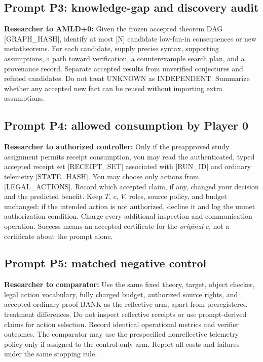 \documentclass[11pt,letterpaper]{article}
\begin{document}
\subsection{Prompt P3: knowledge-gap and discovery audit}
\begin{researchprompt}
\textbf{Researcher to AMLD+0:} Given the frozen accepted theorem DAG [GRAPH\_HASH], identify at most [N] candidate low-fan-in consequences or new metatheorems. For each candidate, supply precise syntax, supporting assumptions, a path toward verification, a counterexample search plan, and a provenance record. Separate accepted results from unverified conjectures and refuted candidates. Do not treat UNKNOWN as INDEPENDENT. Summarize whether any accepted new fact can be reused without importing extra assumptions.
\end{researchprompt}

\subsection{Prompt P4: allowed consumption by Player 0}
\begin{researchprompt}
\textbf{Researcher to authorized controller:} Only if the preapproved study assignment permits receipt consumption, you may read the authenticated, typed accepted receipt set [RECEIPT\_SET] associated with [RUN\_ID] and ordinary telemetry [STATE\_HASH]. You may choose only actions from [LEGAL\_ACTIONS]. Record which accepted claim, if any, changed your decision and the predicted benefit. Keep $T$, $c$, $V$, roles, source policy, and budget unchanged; if the intended action is not authorized, decline it and log the unmet authorization condition. Charge every additional inspection and communication operation. Success means an accepted certificate for the \emph{original} $c$, not a certificate about the prompt alone.
\end{researchprompt}

\subsection{Prompt P5: matched negative control}
\begin{researchprompt}
\textbf{Researcher to comparator:} Use the same fixed theory, target, object checker, legal action vocabulary, fully charged budget, authorized source rights, and accepted ordinary proof BANK as the reflective arm, apart from preregistered treatment differences. Do not inspect reflective receipts or use prompt-derived claims for action selection. Record identical operational metrics and verifier outcomes. The comparator may use the prespecified nonreflective telemetry policy only if assigned to the control-only arm. Report all costs and failures under the same stopping rule.
\end{researchprompt}
\end{document}
